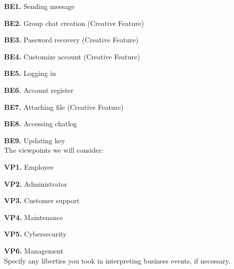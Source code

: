 \documentclass[]{article}
\begin{document}
\textbf{BE1.} Sending message

\textbf{BE2.} Group chat creation (Creative Feature)

\textbf{BE3.} Password recovery (Creative Feature)

\textbf{BE4.} Customize account (Creative Feature)

\textbf{BE5.} Logging in

\textbf{BE6.} Account register

\textbf{BE7.} Attaching file (Creative Feature)

\textbf{BE8.} Accessing chatlog

\textbf{BE9.} Updating key\\

\noindent The viewpoints we will consider:

\textbf{VP1.} Employee

\textbf{VP2.} Administrator

\textbf{VP3.} Customer support

\textbf{VP4.} Maintenance

\textbf{VP5.} Cybersecurity

\textbf{VP6.} Management\\

 Specify any liberties you took in interpreting business events, if necessary.\\
\end{document}
